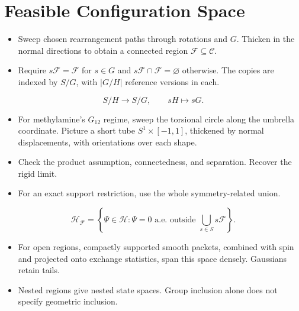 \documentclass[12pt]{article}
\newcommand{\hilb}{\mathcal{H}}
\newcommand{\conf}{\mathcal{C}}
\begin{document}
\section{Feasible Configuration Space}
\label{sec:feasible-space}
\begin{itemize}
\item Sweep chosen rearrangement paths through rotations and $G$.
Thicken in the normal directions to obtain a connected region
$\mathcal F\subseteq\conf$.
\item Require $s\mathcal F=\mathcal F$ for $s\in G$ and
$s\mathcal F\cap\mathcal F=\varnothing$ otherwise.
The copies are indexed by $S/G$, with $|G/H|$ reference versions in each.
\end{itemize}
\[
S/H\longrightarrow S/G,\qquad sH\longmapsto sG.
\]
\begin{itemize}
\item For methylamine's $G_{12}$ regime, sweep the torsional circle
along the umbrella coordinate. Picture a short tube $S^1\times[-1,1]$,
thickened by normal displacements, with orientations over each shape.
\item Check the product assumption, connectedness, and separation.
Recover the rigid limit.
\end{itemize}

\begin{itemize}
\item For an exact support restriction, use the whole symmetry-related union.
\end{itemize}
\[
\hilb_{\mathcal F}
=\left\{\Psi\in\hilb:
\Psi=0\text{ a.e. outside }\bigcup_{s\in S}s\mathcal F\right\}.
\]
\begin{itemize}
\item For open regions, compactly supported smooth packets, combined
with spin and projected onto exchange statistics, span this space densely.
Gaussians retain tails.
\item Nested regions give nested state spaces. Group inclusion alone
does not specify geometric inclusion.
\end{itemize}
\end{document}
